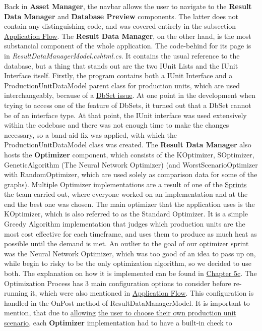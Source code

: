 \documentclass[12pt]{report}
\begin{document}
Back in \textbf{Asset Manager}, the navbar allows the user to navigate to the \textbf{Result Data Manager} and \textbf{Database Preview}
components. The latter does not contain any distinguishing code, and was covered entirely in the subsection \hyperref[sec:appflow]{Application Flow}.
The \textbf{Result Data Manager}, on the other hand, is the most substancial component of the whole application. The code-behind for its page
is in \textit{ResultDataManagerModel.cshtml.cs}. It contains the usual reference to the database, but a thing that stands out
are the two IUnit Lists and the IUnit Interface itself. Firstly, the program contains both a IUnit Interface and a ProductionUnitDataModel parent class
for production units, which are used interchangeably, because of a \underline{DbSet issue}. At one point in the development
when trying to access one of the feature of DbSets, it turned out that a DbSet cannot be of an interface type. At that point, the IUnit
interface was used extensively within the codebase and there was not enough time to make the changes necessary, so a band-aid fix was applied, with which
the ProductionUnitDataModel class was created. The \textbf{Result Data Manager} also hosts the \textbf{Optimizer}
component, which consists of the KOptimizer, SOptimizer, GeneticAlgorithm (The Neural Network Optimizer) (and WorstScenarioOptimizer with RandomOptimizer, which
are used solely as comparison data for some of the graphs). Multiple Optimizer implementations are a result of one of the
\hyperref[sec:sprints]{Sprints} the team carried out, where everyone worked on an implementation and at the end the best one was chosen.
The main optimizer that the application uses is the KOptimizer, which is also referred to as the Standard Optimizer. It is a simple
Greedy Algorithm implementation that judges which production units are the most cost effective for each timeframe, and uses 
them to produce as much heat as possible until the demand is met. An outlier to the goal of our optimizer sprint was the Neural Network Optimizer,
which was too good of an idea to pass up on, while begin to risky to be the only optimization algorithm, so we decided to use both.
The explanation on how it is implemented can be found in \hyperref[sec:nnexplanation]{Chapter 5c}.
The Optimization Process has 3 main configuration options to consider before re-running it, which were also mentioned in \hyperref[sec:appflow]{Application Flow}.
This configuration is handled in the OnPost method of ResultDataManagerModel. It is important to mention, that due to \underline{allowing}
\underline{the user to choose their own production unit scenario}, each \textbf{Optimizer} implementation had to have a built-in check to
\end{document}
